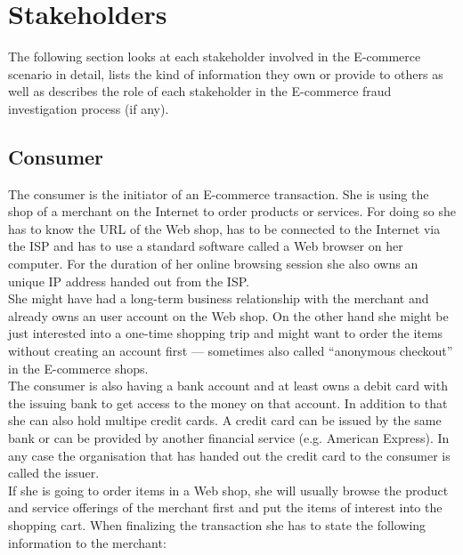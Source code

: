 
\section{Stakeholders}
\label{sec:stakeholder_analysis}

The following section looks at each stakeholder involved in the E-commerce scenario in detail, lists the kind of information they own or provide to others as well as describes the role of each stakeholder in the E-commerce fraud investigation process (if any).

\subsection{Consumer}
\label{subsec:stakeholder_consumer}

The consumer is the initiator of an E-commerce transaction. She is using the shop of a merchant on the Internet to order products or services. For doing so she has to know the \gls{URL} of the Web shop, has to be connected to the Internet via the \gls{ISP} and has to use a standard software called a Web browser on her computer. For the duration of her online browsing session she also owns an unique \gls{IP} address handed out from the \gls{ISP}.\\

She might have had a long-term business relationship with the merchant and already owns an user account on the Web shop. On the other hand she might be just interested into a one-time shopping trip and might want to order the items without creating an account first --- sometimes also called ``anonymous checkout'' in the E-commerce shops. \\

The consumer is also having a bank account and at least owns a debit card with the issuing bank to get access to the money on that account. In addition to that she can also hold multipe credit cards. A credit card can be issued by the same bank or can be provided by another financial service (e.g. American Express). In any case the organisation that has handed out the credit card to the consumer is called the issuer. \\

If she is going to order items in a Web shop, she will usually browse the product and service offerings of the merchant first and put the items of interest into the shopping cart. When finalizing the transaction she has to state the following information to the merchant:\@

